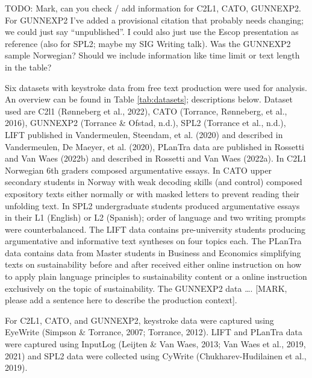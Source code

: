 \documentclass[
  man,floatsintext]{apa7}
\begin{document}
TODO: Mark, can you check / add information for C2L1, CATO, GUNNEXP2. For GUNNEXP2 I've added a provisional citation that probably needs changing; we could just say \enquote{unpublished}. I could also just use the Escop presentation as reference (also for SPL2; maybe my SIG Writing talk). Was the GUNNEXP2 sample Norwegian? Should we include information like time limit or text length in the table?

Six datasets with keystroke data from free text production were used for analysis. An overview can be found in Table \ref{tab:datasets}; descriptions below. Dataset used are C2l1 (Rønneberg et al., 2022), CATO (Torrance, Rønneberg, et al., 2016), GUNNEXP2 (Torrance \& Ofstad, n.d.), SPL2 (Torrance et al., n.d.), LIFT published in Vandermeulen, Steendam, et al. (2020) and described in Vandermeulen, De Maeyer, et al. (2020), PLanTra data are published in Rossetti and Van Waes (2022b) and described in Rossetti and Van Waes (2022a). In C2L1 Norwegian 6th graders composed argumentative essays. In CATO upper secondary students in Norway with weak decoding skills (and control) composed expository texts either normally or with masked letters to prevent reading their unfolding text. In SPL2 undergraduate students produced argumentative essays in their L1 (English) or L2 (Spanish); order of language and two writing prompts were counterbalanced. The LIFT data contains pre-university students producing argumentative and informative text syntheses on four topics each. The PLanTra data contains data from Master students in Business and Economics simplifying texts on sustainability before and after received either online instruction on how to apply plain language principles to sustainability content or a online instruction exclusively on the topic of sustainability. The GUNNEXP2 data \ldots. {[}MARK, please add a sentence here to describe the production context{]}.

For C2L1, CATO, and GUNNEXP2, keystroke data were captured using EyeWrite (Simpson \& Torrance, 2007; Torrance, 2012). LIFT and PLanTra data were captured using InputLog (Leijten \& Van Waes, 2013; Van Waes et al., 2019, 2021) and SPL2 data were collected using CyWrite (Chukharev-Hudilainen et al., 2019).
\end{document}

